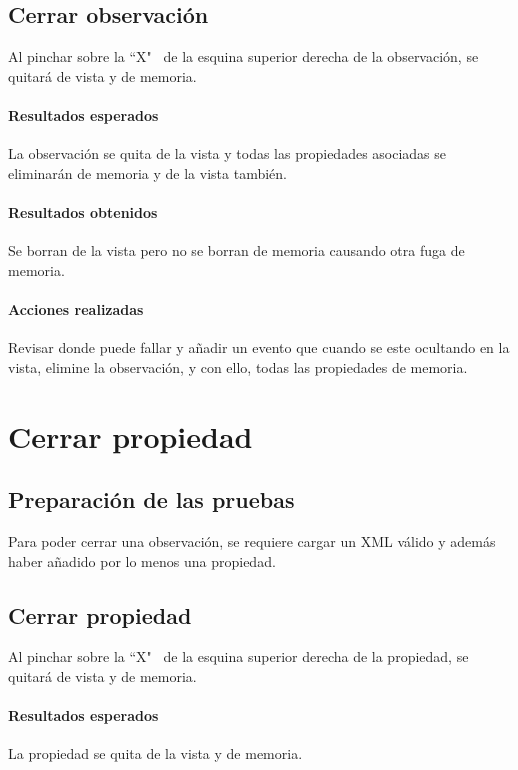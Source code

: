 \subsection{Cerrar observaci\'on}
Al pinchar sobre la ``X" \ de la esquina superior derecha de la observaci\'on,
se quitar\'a de vista y de memoria.

\paragraph{Resultados esperados}
La observaci\'on se quita de la vista y todas las propiedades asociadas se eliminar\'an
de memoria y de la vista tambi\'en.

\paragraph{Resultados obtenidos}
Se borran de la vista pero no se borran de memoria causando otra fuga de memoria.

\paragraph{Acciones realizadas}
Revisar donde puede fallar y a\~nadir un evento que cuando se este ocultando en la
vista, elimine la observaci\'on, y con ello, todas las propiedades de memoria.

\section{Cerrar propiedad}
\subsection{Preparaci\'on de las pruebas}
Para poder cerrar una observaci\'on, se requiere cargar un XML v\'alido y
adem\'as haber a\~nadido por lo menos una propiedad.

\subsection{Cerrar propiedad}
Al pinchar sobre la ``X" \ de la esquina superior derecha de la propiedad,
se quitar\'a de vista y de memoria.

\paragraph{Resultados esperados}
La propiedad se quita de la vista y de memoria.

